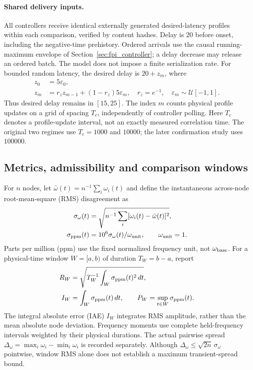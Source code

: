 \paragraph{Shared delivery inputs.}
All controllers receive identical externally generated desired-latency
profiles within each comparison, verified by content hashes. Delay is
20 before onset, including the negative-time prehistory. Ordered arrivals
use the causal running-maximum envelope of
Section~\ref{sec:fpi_controller}; a delay decrease may release an ordered
batch. The model does not impose a finite serialization rate.
For bounded random latency, the desired delay is $20+z_m$, where
\begin{align}
 z_0&=5\varepsilon_0,\nonumber\\
 z_m&=r_z z_{m-1}+(1-r_z)5\varepsilon_m,
 \quad r_z=e^{-1},\quad\varepsilon_m\sim\mathcal U[-1,1].
 \label{eq:eval_random_profile}
\end{align}
Thus desired delay remains in $[15,25]$. The index $m$ counts physical
profile updates on a grid of spacing $T_c$, independently of controller
polling. Here $T_c$ denotes a profile-update interval, not an exactly
measured correlation time. The original two regimes use $T_c=1000$
and $10000$; the later confirmation study uses $100000$.

\subsection{Metrics, admissibility and comparison windows}
\label{subsec:eval_metrics}

For $n$ nodes, let $\bar\omega(t)=n^{-1}\sum_i\omega_i(t)$ and define
the instantaneous across-node root-mean-square (RMS) disagreement as
\begin{align}
 \sigma_\omega(t)&=\sqrt{n^{-1}\sum_i[\omega_i(t)-\bar\omega(t)]^2},\nonumber\\
 \sigma_{\rm ppm}(t)&=10^6\sigma_\omega(t)/\omega_{\rm unit},
 \qquad\omega_{\rm unit}=1.
 \label{eq:eval_disagreement_amplitude}
\end{align}
Parts per million (ppm) use the fixed normalized frequency unit, not
$\omega_{\rm base}$. For a physical-time window $W=[a,b)$ of duration
$T_W=b-a$, report
\begin{align}
 R_W&=\sqrt{T_W^{-1}\int_W\sigma_{\rm ppm}(t)^2\,dt},\nonumber\\
 I_W&=\int_W\sigma_{\rm ppm}(t)\,dt,
 \qquad P_W=\sup_{t\in W}\sigma_{\rm ppm}(t).
 \label{eq:eval_frequency_metrics}
\end{align}
The integral absolute error (IAE) $I_W$ integrates RMS amplitude, rather
than the mean absolute node deviation. Frequency moments use complete
held-frequency intervals weighted by their physical durations.
The actual pairwise spread $\Delta_\omega=\max_i\omega_i-\min_i\omega_i$
is recorded separately. Although
$\Delta_\omega\le\sqrt{2n}\,\sigma_\omega$ pointwise, window RMS alone
does not establish a maximum transient-spread bound.

